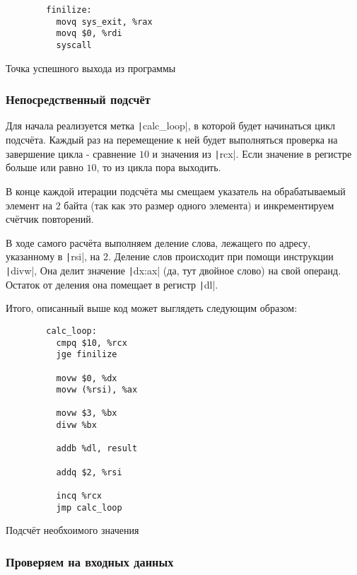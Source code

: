 \documentclass[a4paper]{article}
\begin{document}
  \begin{listing}[H]
    \begin{verbatim}
        finilize:
          movq sys_exit, %rax
          movq $0, %rdi
          syscall
    \end{verbatim}
    \caption{Точка успешного выхода из программы}
  \end{listing}

  \subsubsection{Непосредственный подсчёт}

  Для начала реализуется метка \texttt|calc_loop|,
  в которой будет начинаться цикл подсчёта. Каждый раз на перемещение
  к ней будет выполняться проверка на завершение цикла - сравнение
  $10$ и значения из \texttt|rcx|. Если значение в регистре
  больше или равно $10$, то из цикла пора выходить.

  В конце каждой итерации подсчёта мы смещаем указатель на
  обрабатываемый элемент на 2 байта (так как это размер одного элемента)
  и инкрементируем счётчик повторений.

  В ходе самого расчёта выполняем деление слова, лежащего по адресу,
  указанному в \texttt|rsi|, на 2. Деление слов
  происходит при помощи инструкции \texttt|divw|,
  Она делит значение \texttt|dx:ax| (да, тут двойное слово)
  на свой операнд. Остаток от деления она помещает в регистр \texttt|dl|.

  Итого, описанный выше код может выглядеть следующим образом:
  \begin{listing}[H]
    \begin{verbatim}
        calc_loop:
          cmpq $10, %rcx
          jge finilize
    
          movw $0, %dx
          movw (%rsi), %ax
    
          movw $3, %bx
          divw %bx
    
          addb %dl, result
    
          addq $2, %rsi
    
          incq %rcx
          jmp calc_loop
    \end{verbatim}
    \caption{Подсчёт необхоимого значения}
  \end{listing}

  \subsubsection{Проверяем на входных данных}
\end{document}
